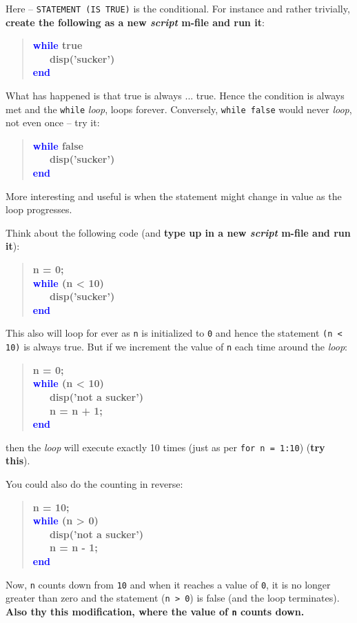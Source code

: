 \documentclass{tufte-book} %
\newenvironment{docspecbold}{\begin{quotation}\ttfamily\bfseries\parskip0pt\parindent0pt\ignorespaces}{\end{quotation}}
\begin{document}
Here -- \texttt{STATEMENT (IS TRUE)} is the conditional. For instance and rather trivially, \textbf{create the following as a new \textit{script} m-file and run it}:
\begin{docspecbold}
\textcolor{blue}{while} true
\\ \ \ \ disp('sucker')
\\\textcolor{blue}{end}
\end{docspecbold}
What has happened is that true is always ... true. Hence the condition is always met and the \texttt{while} \textit{loop}, loops forever. Conversely, \texttt{while false} would never \textit{loop}, not even once -- try it:
\begin{docspecbold}
\textcolor{blue}{while} false
\\ \ \ \ disp('sucker')
\\\textcolor{blue}{end}
\end{docspecbold}

More interesting and useful is when the statement might change in value as the loop progresses.

Think about the following code (and \textbf{type up in a new \textit{script} m-file and run it}):
\begin{docspecbold}
n = 0;
\\\textcolor{blue}{while} (n < 10)
\\ \ \ \ disp('sucker')
\\\textcolor{blue}{end}
\end{docspecbold}

This also will loop for ever as \texttt{n} is initialized to \texttt{0} and hence the statement \texttt{(n < 10)} is always true. But if we increment the value of \texttt{n} each time around the \textit{loop}: 
\begin{docspecbold}
n = 0;
\\\textcolor{blue}{while} (n < 10)
\\ \ \ \ disp('not a sucker')
\\ \ \ \ n = n + 1;
\\\textcolor{blue}{end}
\end{docspecbold}
then the \textit{loop} will execute exactly 10 times (just as per \texttt{for n = 1:10}) (\textbf{try this}).

You could also do the counting in reverse: 
\begin{docspecbold}
n = 10;
\\\textcolor{blue}{while} (n > 0)
\\ \ \ \ disp('not a sucker')
\\ \ \ \ n = n - 1;
\\\textcolor{blue}{end}
\end{docspecbold}
Now, \texttt{n} counts down from \texttt{10} and when it reaches a value of \texttt{0}, it is no longer greater than zero and the statement (\texttt{n > 0}) is false (and the loop terminates). \textbf{Also thy this modification, where the value of \texttt{n} counts down.}
\end{document}
